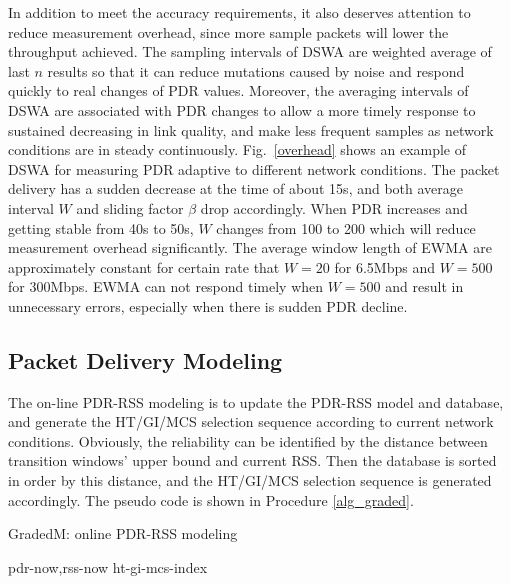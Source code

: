 \documentclass[draftclsnofoot,journal,onecolumn,11pt]{IEEEtran}
\begin{document}
In addition to meet the accuracy requirements, it also deserves attention to reduce measurement overhead, since more sample packets will lower the throughput achieved. The sampling intervals of DSWA are weighted average of last $n$ results so that it can reduce mutations caused by noise and respond quickly to real changes of PDR values. Moreover, the averaging intervals of DSWA are associated with PDR changes to allow a more timely response to sustained decreasing in link quality, and make less frequent samples as network conditions are in steady continuously. Fig.~\ref{overhead} shows an example of DSWA for measuring PDR adaptive to different network conditions. The packet delivery has a sudden decrease at the time of about 15s, and both average interval $W$ and sliding factor $\beta$ drop accordingly. When PDR increases and getting stable from 40s to 50s, $W$ changes from 100 to 200 which will reduce measurement overhead significantly. The average window length of EWMA are approximately constant for certain rate that $W=20$ for 6.5Mbps and $W=500$ for 300Mbps. EWMA can not respond timely when $W=500$ and result in unnecessary errors, especially when there is sudden PDR decline.

\subsection{Packet Delivery Modeling} \label{sect:modeling}

The on-line PDR-RSS modeling is to update the PDR-RSS model and database, and generate the HT/GI/MCS selection sequence according to current network conditions. Obviously, the reliability can be identified by the distance between transition windows' upper bound and current RSS. Then the database is sorted in order by this distance, and the HT/GI/MCS selection sequence is generated accordingly. The pseudo code is shown in Procedure \ref{alg_graded}.
\begin{algorithm}[!htp]
\renewcommand{\algorithmicrequire}{\textbf{Input:}}
\renewcommand{\algorithmicensure}{\textbf{Output:}}
\caption{GradedM: online PDR-RSS modeling}
\label{alg_graded}
\begin{algorithmic}[1]
\Require pdr-now,rss-now
\Ensure  ht-gi-mcs-index
 \label{delta-changed}
\EndIf \label{delta-updated}
 \label{ht-gi}
 \label{ht-gi-mcs}
\State {}
\end{algorithmic}
\end{algorithm}
\end{document}

